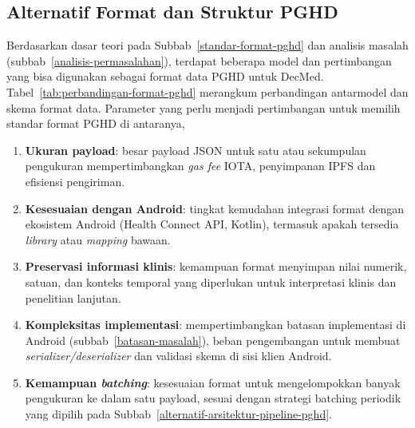 \subsection{Alternatif Format dan Struktur PGHD}\label{analisis-alternatif-format-pghd}

Berdasarkan dasar teori pada Subbab~\ref{standar-format-pghd} dan analisis masalah (subbab~\ref{analisis-permasalahan}), terdapat beberapa model dan pertimbangan yang bisa digunakan sebagai format data PGHD untuk DecMed.
Tabel~\ref{tab:perbandingan-format-pghd} merangkum perbandingan antarmodel dan skema format data.
Parameter yang perlu menjadi pertimbangan untuk memilih standar format PGHD di antaranya,

\begin{enumerate}
  \item \textbf{Ukuran payload}: besar payload JSON untuk satu atau sekumpulan pengukuran mempertimbangkan \textit{gas fee} IOTA, penyimpanan IPFS dan efisiensi pengiriman.
  \item \textbf{Kesesuaian dengan Android}: tingkat kemudahan integrasi format dengan ekosistem Android (Health Connect API, Kotlin), termasuk apakah tersedia \textit{library} atau \textit{mapping} bawaan.
  \item \textbf{Preservasi informasi klinis}: kemampuan format menyimpan nilai numerik, satuan, dan konteks temporal yang diperlukan untuk interpretasi klinis dan penelitian lanjutan.
  \item \textbf{Kompleksitas implementasi}: mempertimbangkan batasan implementasi di Android (subbab~\ref{batasan-masalah}), beban pengembangan untuk membuat \textit{serializer/deserializer} dan validasi skema di sisi klien Android.
  \item \textbf{Kemampuan \textit{batching}}: kesesuaian format untuk mengelompokkan banyak pengukuran ke dalam satu payload, sesuai dengan strategi batching periodik yang dipilih pada Subbab~\ref{alternatif-arsitektur-pipeline-pghd}.
\end{enumerate}


